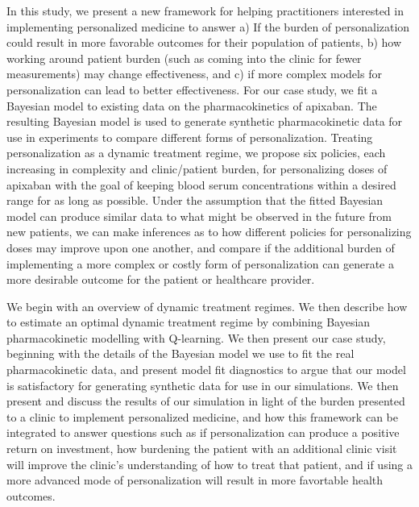  In this study, we present a new framework for helping practitioners interested in implementing personalized medicine to answer a) If the burden of personalization could result in more favorable outcomes for their population of patients, b) how working around patient burden (such as coming into the clinic for fewer measurements) may change effectiveness, and c) if more complex models for personalization can lead to better effectiveness. For our case study, we fit a Bayesian model to existing data on the pharmacokinetics of apixaban.  The resulting Bayesian model is used to generate synthetic pharmacokinetic data for use in experiments to compare different forms of personalization. Treating personalization as a dynamic treatment regime, we propose six policies, each increasing in complexity and clinic/patient burden, for personalizing doses of apixaban with the goal of keeping blood serum concentrations within a desired range for as long as possible. Under the assumption that the fitted Bayesian model can produce similar data to what might be observed in the future from new patients, we can make inferences as to how different policies for personalizing doses may improve upon one another, and compare if the additional burden of implementing a more complex or costly form of personalization can generate a more desirable outcome for the patient or healthcare provider.  

We begin with an overview of dynamic treatment regimes.  We then describe how to estimate an optimal dynamic treatment regime  by combining Bayesian pharmacokinetic modelling with Q-learning.  We then present our case study, beginning with the details of the Bayesian model we use to fit the real pharmacokinetic data, and present model fit diagnostics to argue that our model is satisfactory for generating synthetic data for use in our simulations. We then present and discuss the results of our simulation in light of the burden presented to a clinic to implement personalized medicine, and how this framework can be integrated to answer questions such as if personalization can produce a positive return on investment, how burdening the patient with an additional clinic visit will improve the clinic's understanding of how to treat that patient, and if using a more advanced mode of personalization will result in more favortable health outcomes.
